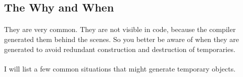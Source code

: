 \documentclass{article}
\begin{document}
 \subsection{The Why and When}
 \paragraph{}
 They are very common. They are not visible in code, because the compiler generated them behind the scenes.
 So you better be aware of when they are generated to avoid redundant construction and destruction of temporaries.

 \paragraph{}
 I will list a few common situations that might generate temporary objects.
\end{document}
